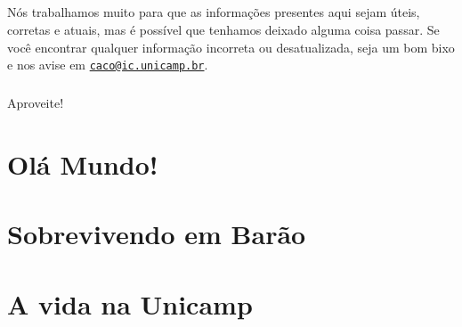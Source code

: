 \documentclass[a4paper,10pt,twocolumn]{book}
\newcommand{\email}[1]{\href{mailto:#1}{\nolinkurl{#1}}}
\begin{document}
\paragraph{}
Nós trabalhamos muito para que as informações presentes aqui sejam úteis,
corretas e atuais, mas é possível que tenhamos deixado alguma coisa passar. Se
você encontrar qualquer informação incorreta ou desatualizada, seja um bom bixo
e nos avise em \email{caco@ic.unicamp.br}.

\paragraph{}
Aproveite!


\tableofcontents

\mainmatter
\onecolumn

\chapter{Olá Mundo!}



\clearpage

\onecolumn



\clearpage



\clearpage

\twocolumn


\newpage

\chapter{Sobrevivendo em Barão}

\newpage

\newpage

\newpage

\newpage

\chapter{A vida na Unicamp}

\newpage

\newpage

\newpage
\end{document}
